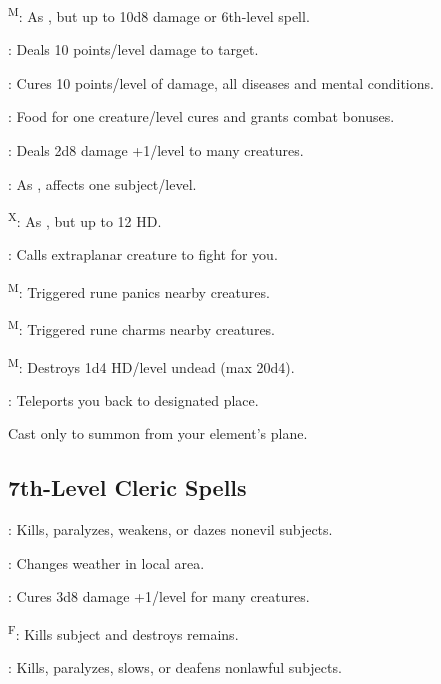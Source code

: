 \textsuperscript{M}: As , but up to 10d8 damage or 6th-level spell.

: Deals 10 points/level damage to target.

: Cures 10 points/level of damage, all diseases and mental conditions.

: Food for one creature/level cures and grants combat bonuses.

: Deals 2d8 damage +1/level to many creatures.

: As , affects one subject/level.

\textsuperscript{X}: As , but up to 12 HD.

\footnotemark[1]: Calls extraplanar creature to fight for you.

\textsuperscript{M}: Triggered rune panics nearby creatures.

\textsuperscript{M}: Triggered rune charms nearby creatures.

\textsuperscript{M}: Destroys 1d4 HD/level undead (max 20d4).


: Teleports you back to designated place.

 Cast only to summon from your element's plane.



\subsection{7th-Level Cleric Spells}

: Kills, paralyzes, weakens, or dazes nonevil subjects.

: Changes weather in local area.

: Cures 3d8 damage +1/level for many creatures.

\textsuperscript{F}: Kills subject and destroys remains.

: Kills, paralyzes, slows, or deafens nonlawful subjects.

